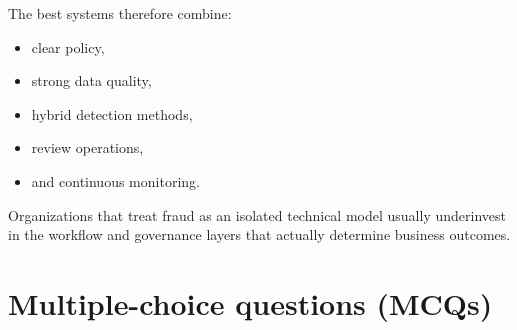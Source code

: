 The best systems therefore combine:
\begin{itemize}
  \item clear policy,
  \item strong data quality,
  \item hybrid detection methods,
  \item review operations,
  \item and continuous monitoring.
\end{itemize}

Organizations that treat fraud as an isolated technical model usually underinvest in the workflow and governance layers that actually determine business outcomes.

\section{Multiple-choice questions (MCQs)}
